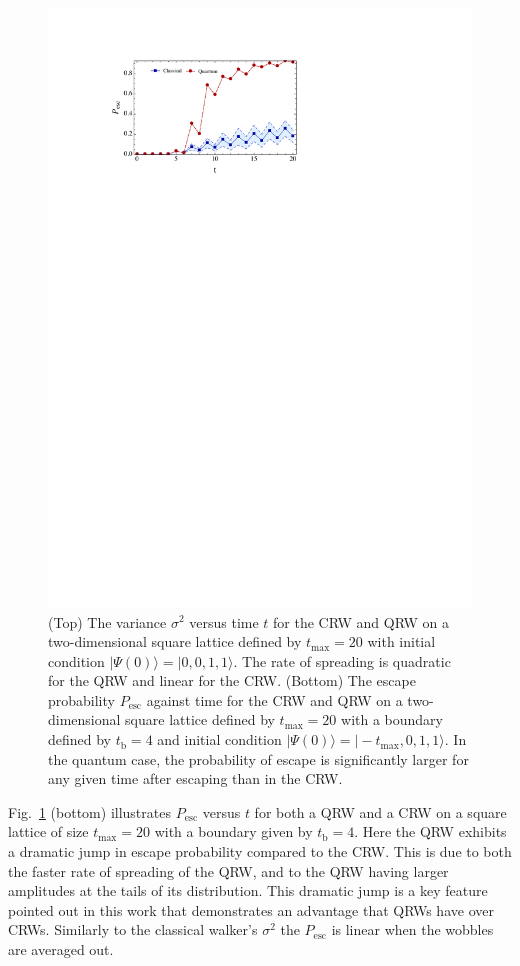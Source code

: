 \documentclass[aps,pra,twocolumn,amsmath,amssymb,nofootinbib,superscriptaddress]{revtex4}
\newcommand{\ket}[1]{|#1\rangle}
\newcommand{\keith}[1]{{\color{cyan}{#1}}}
\begin{document}
\begin{figure}[!htb]
\includegraphics[scale=0.88]{PescVsTime.pdf}
\caption{\label{fig:PescVsTime} (Top) The variance $\sigma^{2}$ versus time $t$ for the CRW and QRW on a two-dimensional square lattice defined by $t_\mathrm{max}=20$ with initial condition $\ket{\Psi(0)}=\ket{0,0,1,1}$. The rate of spreading is quadratic for the QRW and linear for the CRW. (Bottom) The escape probability $P_\mathrm{esc}$ against time for the CRW and QRW on a two-dimensional square lattice defined by $t_\mathrm{max}=20$ with a boundary defined by $t_\mathrm{b}=4$ and initial condition $\ket{\Psi(0)}=\ket{-t_{\mathrm{max}},0,1,1}$. In the quantum case, the probability of escape is significantly larger for any given time after escaping than in the CRW.}
\end{figure}

Fig.~\ref{fig:PescVsTime} (bottom) illustrates $P_\mathrm{esc}$ versus $t$ for both a QRW and a CRW on a square lattice of size $t_\mathrm{max}=20$ with a boundary given by $t_\mathrm{b}=4$. Here the QRW exhibits a dramatic jump in escape probability compared to the CRW. This is due to both the faster rate of spreading of the QRW, and to the QRW having larger amplitudes at the tails of its distribution. This dramatic jump is a key feature pointed out in this work that demonstrates an advantage that QRWs have over CRWs. Similarly to the classical walker's $\sigma^{2}$ the $P_{\mathrm{esc}}$ is linear when the wobbles are averaged out. \keith{C) The walkers reach the escape boundary in a time that is regarded as the transient regime, where long-time dynamics have not set in.} 
\end{document}
